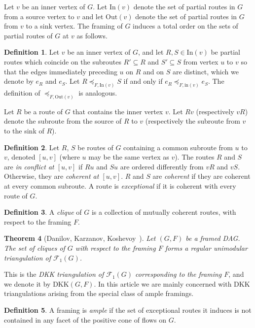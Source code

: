 \documentclass[12pt]{amsart}
\newtheorem{theorem}{Theorem}[section]
\theoremstyle{definition}
\newtheorem{definition}[theorem]{Definition}
\newcommand{\defn}[1]{\emph{\color{blue} #1}}
\newcommand\calF{\mathcal{F}}
\newcommand{\DKK}{\mathrm{DKK}}
\newcommand\In{\mathrm{In}}
\newcommand\inedge{\mathrm{in}}
\newcommand\Out{\mathrm{Out}}
\begin{document}
Let $v$ be an inner vertex of $G$.
Let $\In(v)$ denote the set of partial routes in $G$ from a source vertex to $v$ and let $\Out(v)$ denote the set of partial routes in $G$ from $v$ to a sink vertex.
The framing of $G$ induces a total order on the sets of partial routes of $G$ at $v$ as follows.

\begin{definition}
Let $v$ be an inner vertex of $G$, and let $R, S \in \In(v)$ be partial routes which coincide on the subroutes $R'\subseteq R$ and $S'\subseteq S$ from vertex $u$ to $v$ so that the edges immediately preceding $u$ on $R$ and on $S$ are distinct, which we denote by $e_R$ and $e_S$.
Let $R \preceq_{F,\In(v)} S$ if and only if $e_R \preceq_{F, \inedge(v)} e_S$.
The definition of $\preceq_{F,\Out(v)}$ is analogous.
\end{definition}

Let $R$ be a route of $G$ that contains the inner vertex $v$.
Let $Rv$ (respectively $vR$) denote the subroute from the source of $R$ to $v$ (respectively the subroute from $v$ to the sink of $R$).
\begin{definition}
Let $R$, $S$ be routes of $G$ containing a common subroute from $u$ to $v$, denoted $[u,v]$ (where $u$ may be the same vertex as $v$).
The routes $R$ and $S$ are \defn{in conflict at $[u,v]$} if $Ru$ and $Su$ are ordered differently from $vR$ and $vS$.  
Otherwise, they are \defn{coherent at $[u,v]$}.
$R$ and $S$ are \defn{coherent} if they are coherent at every common subroute.
A route is \defn{exceptional} if it is coherent with every route of $G$.
\end{definition}

\begin{definition}
A \defn{clique} of $G$ is a collection of mutually coherent routes, with respect to the framing $F$.    
\end{definition}

\begin{theorem}[{Danilov, Karzanov, Koshevoy~\cite{DKK12}}]\label{thm:dkk-triangulation}
Let $(G,F)$ be a framed DAG.
The set of cliques of $G$ with respect to the framing $F$ forms a regular unimodular triangulation of $\calF_1(G)$.
\end{theorem}
This is the \defn{DKK triangulation of $\calF_1(G)$ corresponding to the framing $F$}, and we denote it by $\DKK(G,F)$.
In this article we are mainly concerned with DKK triangulations arising from the special class of ample framings. 

\begin{definition}\label{def:ampleframing}
A framing is \defn{ample} if the set of exceptional routes it induces is not contained in any facet of the positive cone of flows on $G$.
\end{definition}
\end{document}

